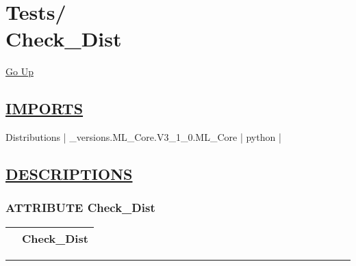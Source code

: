 \chapter*{\color{headfile}
{\large Tests\slash\hspace{0pt}}
 \\
Check_Dist
}
\hypertarget{ecldoc:toc:Tests.Check_Dist}{}
\hyperlink{ecldoc:toc:root/Tests}{Go Up}

\section*{\underline{\textsf{IMPORTS}}}
\begin{doublespace}
{\large
Distributions |
\_versions.ML\_Core.V3\_1\_0.ML\_Core |
python |
}
\end{doublespace}

\section*{\underline{\textsf{DESCRIPTIONS}}}
\subsection*{\textsf{\colorbox{headtoc}{\color{white} ATTRIBUTE}
Check\_Dist}}

\hypertarget{ecldoc:tests.check_dist}{}

{\renewcommand{\arraystretch}{1.5}
\begin{tabularx}{\textwidth}{|>{\raggedright\arraybackslash}l|X|}
\hline
\hspace{0pt}\mytexttt{\color{red} } & \textbf{Check\_Dist} \\
\hline
\end{tabularx}
}

\par


\rule{\linewidth}{0.5pt}
